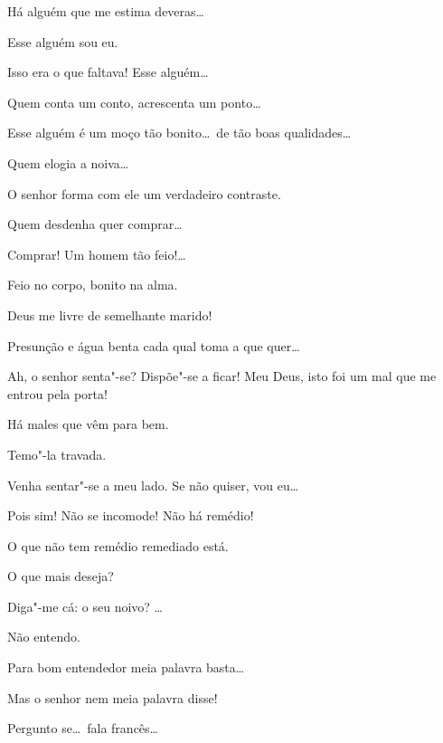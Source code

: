   Há alguém que me estima deveras\ldots

  Esse alguém  sou eu.

  Isso era o que faltava!  Esse alguém\ldots

  Quem conta um conto, acrescenta um ponto\ldots

  Esse alguém é um moço tão bonito\ldots\ de tão boas
qualidades\ldots

  Quem elogia a noiva\ldots

  O senhor forma com ele um verdadeiro contraste.

  Quem desdenha quer comprar\ldots

  Comprar! Um homem tão feio!\ldots

  Feio no corpo, bonito na alma.

   Deus me livre de semelhante marido!

  Presunção e água benta cada qual toma a que quer\ldots
{}

   Ah, o senhor senta"-se? Dispõe"-se a ficar! Meu
Deus, isto foi um mal que me entrou pela porta!

   Há males que vêm para bem.

  Temo"-la travada.

  Venha sentar"-se a meu lado.  Se não quiser, vou eu\ldots\ 

  Pois sim! Não se incomode!  Não há
remédio!

   O que não tem remédio remediado
está.

  O que mais deseja?

  Diga"-me cá: o seu noivo? \ldots\ 

  Não entendo.

  Para bom entendedor meia palavra basta\ldots

  Mas o senhor nem meia palavra disse!

  Pergunto se\ldots\ fala francês\ldots

